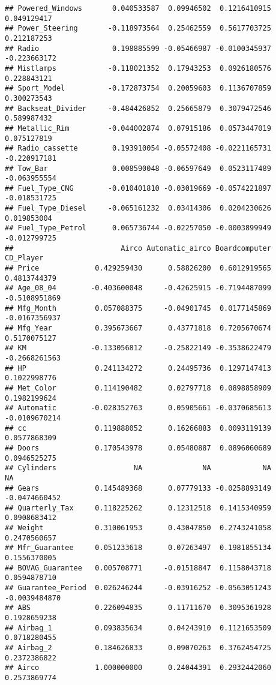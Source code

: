 \documentclass[]{article}
\begin{document}
\begin{verbatim}
## Powered_Windows       0.040533587  0.09946502  0.1216410915  0.049129417
## Power_Steering       -0.118973564  0.25462559  0.5617703725  0.212187253
## Radio                 0.198885599 -0.05466987 -0.0100345937 -0.223663172
## Mistlamps            -0.118021352  0.17943253  0.0926180576  0.228843121
## Sport_Model          -0.172873754  0.20059603  0.1136707859  0.300273543
## Backseat_Divider     -0.484426852  0.25665879  0.3079472546  0.589987432
## Metallic_Rim         -0.044002874  0.07915186  0.0573447019  0.075127819
## Radio_cassette        0.193910054 -0.05572408 -0.0221165731 -0.220917181
## Tow_Bar               0.008590048 -0.06597649  0.0523117489 -0.063955554
## Fuel_Type_CNG        -0.010401810 -0.03019669 -0.0574221897 -0.018531725
## Fuel_Type_Diesel     -0.065161232  0.03414306  0.0204230626  0.019853004
## Fuel_Type_Petrol      0.065736744 -0.02257050 -0.0003899949 -0.012799725
##                         Airco Automatic_airco Boardcomputer     CD_Player
## Price             0.429259430      0.58826200  0.6012919565  0.4813744379
## Age_08_04        -0.403600048     -0.42625915 -0.7194487099 -0.5108951869
## Mfg_Month         0.057088375     -0.04901745  0.0177145869 -0.0167356937
## Mfg_Year          0.395673667      0.43771818  0.7205670674  0.5170075127
## KM               -0.133056812     -0.25822149 -0.3538622479 -0.2668261563
## HP                0.241134272      0.24495736  0.1297147413  0.1022998776
## Met_Color         0.114190482      0.02797718  0.0898858909  0.1982199624
## Automatic        -0.028352763      0.05905661 -0.0370685613 -0.0109670214
## cc                0.119888052      0.16266883  0.0093119139  0.0577868309
## Doors             0.170543978      0.05480887  0.0896060689  0.0946525275
## Cylinders                  NA              NA            NA            NA
## Gears             0.145489368      0.07779133 -0.0258893149 -0.0474660452
## Quarterly_Tax     0.118225262      0.12312518  0.1415340959  0.0908683412
## Weight            0.310061953      0.43047850  0.2743241058  0.2470560657
## Mfr_Guarantee     0.051233618      0.07263497  0.1981855134  0.1556370005
## BOVAG_Guarantee   0.005708771     -0.01518847  0.1158043718  0.0594878710
## Guarantee_Period  0.026246244     -0.03916252 -0.0563051243 -0.0039484870
## ABS               0.226094835      0.11711670  0.3095361928  0.1928659238
## Airbag_1          0.093835634      0.04243910  0.1121653509  0.0718280455
## Airbag_2          0.184626833      0.09070263  0.3762454725  0.2372386822
## Airco             1.000000000      0.24044391  0.2932442060  0.2573869774

\end{verbatim}
\end{document}
